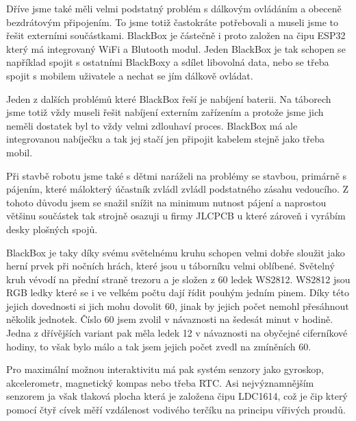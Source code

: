     Dříve jsme také měli velmi podstatný problém s dálkovým ovládáním a obeceně bezdrátovým připojením.
    To jsme totiž častokráte potřebovali a museli jsme to řešit externími součástkami.
    BlackBox je částečně i proto založen na čipu ESP32 který má integrovaný WiFi a Blutooth modul.
    Jeden BlackBox je tak schopen se například spojit s ostatními BlackBoxy a sdílet libovolná data, 
    nebo se třeba spojit s mobilem uživatele a nechat se jím dálkově ovládat.
    
    Jeden z dalších problémů které BlackBox řeší je nabíjení baterii. Na táborech jsme totiž vždy museli
    řešit nabíjení externím zařízením a protože jsme jich neměli dostatek byl to vždy velmi zdlouhaví proces.
    BlackBox má ale integrovanou nabíječku a tak jej stačí jen připojit kabelem stejně jako třeba mobil.

    Při stavbě robotu jsme také s dětmi naráželi na problémy se stavbou, primárně s pájením, které málokterý 
    účastník zvládl zvládl podstatného zásahu vedoucího. Z tohoto důvodu jsem se snažil snížit na minimum 
    nutnost pájení a naprostou většinu součástek tak strojně osazuji u firmy JLCPCB u které zároveň i vyrábím 
    desky plošných spojů.

    BlackBox je taky díky svému světelnému kruhu schopen velmi dobře sloužit jako herní prvek při nočních hrách,
    které jsou u táborníku velmi oblíbené.  %
    Světelný kruh vévodí na přední straně trezoru a je složen z 60 ledek WS2812. WS2812 jsou RGB ledky které 
    se i ve velkém počtu dají řídit pouhým jedním pinem. Díky této jejich dovednosti si jich mohu dovolit 60,
    jinak by jejich počet nemohl přesáhnout několik jednotek. Číslo 60 jsem zvolil v návaznosti na šedesát 
    minut v hodině. Jedna z dřívějších variant pak měla ledek 12 v návaznosti na obyčejné ciferníkové hodiny,
    to však bylo málo a tak jsem jejich počet zvedl na zmíněních 60.

    Pro maximální možnou interaktivitu má pak systém senzory jako gyroskop, akcelerometr, magnetický kompas nebo 
    třeba RTC. Asi nejvýznamnějším senzorem ja však tlaková plocha která je založena čipu LDC1614, což je čip který 
    pomocí čtyř cívek měří vzdálenost vodivého terčíku na principu vířivých proudů.


